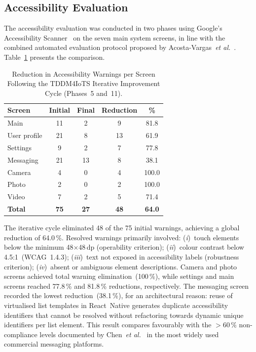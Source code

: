 \documentclass[journal]{IEEEtran}
\begin{document}
	\subsection{Accessibility Evaluation}
	The accessibility evaluation was conducted in two phases using
	Google's Accessibility Scanner~\cite{acosta2021} on the seven
	main system screens, in line with the combined automated
	evaluation protocol proposed by
	Acosta-Vargas~\textit{et al.}~\cite{acosta2021}.
	Table~\ref{tab:accesibilidad} presents the comparison.
	
	\begin{table}[!t]
		\caption{Reduction in Accessibility Warnings per Screen Following
			the TDDM4IoTS Iterative Improvement Cycle (Phases~5 and~11).}
		\label{tab:accesibilidad}
		\centering
		\small
		\renewcommand{\arraystretch}{1.25}
		\begin{tabular}{lcccc}
			\toprule
			\textbf{Screen} & \textbf{Initial} & \textbf{Final} & \textbf{Reduction} & \textbf{\%} \\
			\midrule
			Main           & 11 & 2  & 9  & 81.8 \\
			User profile   & 21 & 8  & 13 & 61.9 \\
			Settings       & 9  & 2  & 7  & 77.8 \\
			Messaging      & 21 & 13 & 8  & 38.1 \\
			Camera         & 4  & 0  & 4  & 100.0 \\
			Photo          & 2  & 0  & 2  & 100.0 \\
			Video          & 7  & 2  & 5  & 71.4 \\
			\midrule
			\textbf{Total} & \textbf{75} & \textbf{27} & \textbf{48} & \textbf{64.0} \\
			\bottomrule
		\end{tabular}
	\end{table}
	
	The iterative cycle eliminated 48 of the 75 initial warnings,
	achieving a global reduction of 64.0\,\%.
	Resolved warnings primarily involved:
	(\textit{i})~touch elements below the minimum 48$\times$48\,dp
	(operability criterion);
	(\textit{ii})~colour contrast below 4.5:1~(WCAG~1.4.3);
	(\textit{iii})~text not exposed in accessibility labels
	(robustness criterion);
	(\textit{iv})~absent or ambiguous element descriptions.
	Camera and photo screens achieved total warning elimination~(100\,\%),
	while settings and main screens reached 77.8\,\% and 81.8\,\%
	reductions, respectively.
	The messaging screen recorded the lowest reduction~(38.1\,\%),
	for an architectural reason: reuse of virtualised list templates
	in React~Native generates duplicate accessibility identifiers
	that cannot be resolved without refactoring towards dynamic
	unique identifiers per list element.
	This result compares favourably with the $>$60\,\%
	non-compliance levels documented by Chen~\textit{et al.}~\cite{chen2022}
	in the most widely used commercial messaging platforms.
	
\end{document}
